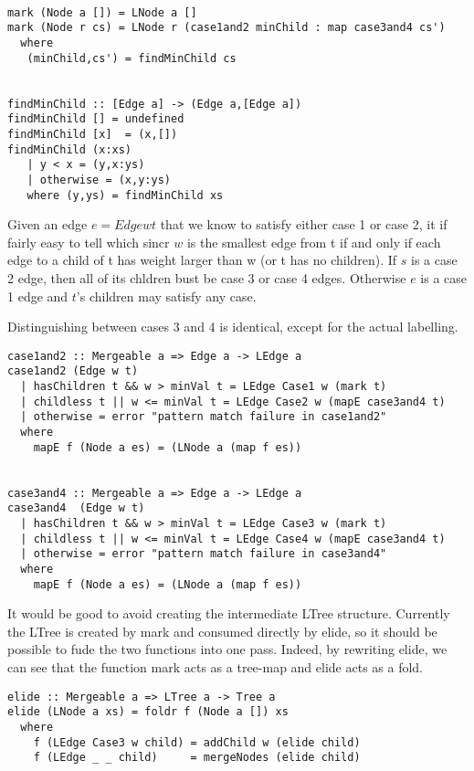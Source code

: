 \documentclass{jfp}
\begin{document}
\begin{verbatim}

mark (Node a []) = LNode a []
mark (Node r cs) = LNode r (case1and2 minChild : map case3and4 cs')
  where
   (minChild,cs') = findMinChild cs


findMinChild :: [Edge a] -> (Edge a,[Edge a])
findMinChild [] = undefined
findMinChild [x]  = (x,[])
findMinChild (x:xs)
   | y < x = (y,x:ys)
   | otherwise = (x,y:ys)
   where (y,ys) = findMinChild xs
\end{verbatim}

Given an edge $e = Edge w t$ that we know to satisfy either case 1 or case 2, it if fairly easy to tell which sincr $w$ is the smallest edge from t if and only if each edge to a child of t has weight larger than w (or t has no children).
If $s$ is a case 2 edge, then all of its chldren bust be case 3 or case 4 edges.
Otherwise $e$ is a case 1 edge and $t$'s children may satisfy any case.

Distinguishing between cases 3 and 4 is identical, except for the actual labelling.

\begin{verbatim}
case1and2 :: Mergeable a => Edge a -> LEdge a
case1and2 (Edge w t)
  | hasChildren t && w > minVal t = LEdge Case1 w (mark t)
  | childless t || w <= minVal t = LEdge Case2 w (mapE case3and4 t)
  | otherwise = error "pattern match failure in case1and2"
  where
    mapE f (Node a es) = (LNode a (map f es))


case3and4 :: Mergeable a => Edge a -> LEdge a
case3and4  (Edge w t)
  | hasChildren t && w > minVal t = LEdge Case3 w (mark t)
  | childless t || w <= minVal t = LEdge Case4 w (mapE case3and4 t)
  | otherwise = error "pattern match failure in case3and4"
  where
    mapE f (Node a es) = (LNode a (map f es))
\end{verbatim}

It would be good to avoid creating the intermediate LTree structure. Currently the LTree is created by mark and consumed directly by elide, so it should be possible to fude the two functions into one pass.
Indeed, by rewriting elide, we can see that the function mark acts as a tree-map and elide acts as a fold.

\begin{verbatim}
elide :: Mergeable a => LTree a -> Tree a
elide (LNode a xs) = foldr f (Node a []) xs
  where
    f (LEdge Case3 w child) = addChild w (elide child)
    f (LEdge _ _ child)     = mergeNodes (elide child)
\end{verbatim}
\end{document}
